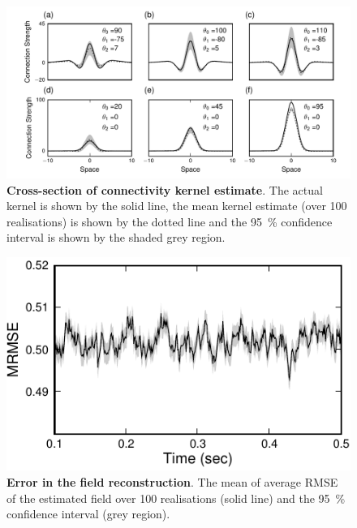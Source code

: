 \documentclass[12pt]{iopart}
\begin{document}
\begin{figure}[!ht]
\begin{center}
\includegraphics{./Graph/pdf/Figure8_1.pdf}
\end{center}
\caption{{\bf Cross-section of connectivity kernel estimate}. The actual kernel is shown by the solid line, the mean kernel estimate (over 100 realisations) is shown by the dotted line and the 95~\% confidence interval is shown by the shaded grey region.}
\label{fig:Figure8}
\end{figure}

\begin{figure}[!ht]
\begin{center}
\includegraphics{./Graph/pdf/Figure9.pdf} 
\end{center}
\caption{{\bf Error in the field reconstruction}. The mean of average RMSE of the estimated field over 100 realisations (solid line) and the 95~\% confidence interval (grey region).} 
\label{fig:Figure9}
\end{figure}
\end{document}
